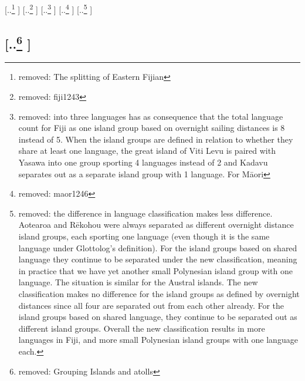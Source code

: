 \documentclass[unnumsec,webpdf,modern,medium]{oup-authoring-template}
\providecommand{\DIFdeltex}[1]{{\protect\color{red} [..\footnote{removed: #1} ]}} %
\providecommand{\DIFdelbegin}{} %
\providecommand{\DIFdelend}{} %
\providecommand{\DIFdel}[1]{\texorpdfstring{\DIFdeltex{#1}}{}} %
\newcommand{\DIFscaledelfig}{0.5}
\newlength{\DIFdelgraphicswidth} %
\newlength{\DIFdelgraphicsheight} %
\newcommand{\DIFdelincludegraphics}[2][]{%
\sbox{\DIFdelgraphicsbox}{\DIFOincludegraphics[#1]{#2}}%
\settoboxwidth{\DIFdelgraphicswidth}{\DIFdelgraphicsbox} %
\settoboxtotalheight{\DIFdelgraphicsheight}{\DIFdelgraphicsbox} %
\scalebox{\DIFscaledelfig}{%
\parbox[b]{\DIFdelgraphicswidth}{\usebox{\DIFdelgraphicsbox}\\[-\baselineskip] \rule{\DIFdelgraphicswidth}{0em}}\llap{\resizebox{\DIFdelgraphicswidth}{\DIFdelgraphicsheight}{%
\setlength{\unitlength}{\DIFdelgraphicswidth}%
\begin{picture}(1,1)%
\thicklines\linethickness{2pt} %
{\color[rgb]{1,0,0}\put(0,0){\framebox(1,1){}}}%
{\color[rgb]{1,0,0}\put(0,0){\line( 1,1){1}}}%
{\color[rgb]{1,0,0}\put(0,1){\line(1,-1){1}}}%
\end{picture}%
}\hspace*{3pt}}} %
} %
\DeclareRobustCommand{\DIFdelbegin}{\DIFOdelbegin \let\includegraphics\DIFdelincludegraphics} %
\DeclareRobustCommand{\DIFdelend}{\DIFOaddend \let\includegraphics\DIFOincludegraphics} %
\begin{document}
\DIFdelbegin \DIFdel{The splitting of Eastern Fijian }%
\DIFdel{fiji1243}%
\DIFdel{into three languages has as consequence that the total language count for Fiji as one island group based on overnight sailing distances is 8 instead of 5. When the island groups are defined in relation to whether they share at least one language, the great island of Viti Levu is paired with Yasawa into one group sporting 4 languages instead of 2 and Kadavu separates out as a separate island group with 1 language. For M\={a}ori }%
\DIFdel{maor1246}%
\DIFdel{the difference in language classification makes less difference. Aotearoa and  R\={e}kohou were always separated as different overnight distance island groups, each sporting one language (even though it is the same language under Glottolog's definition). For the island groups based on shared language they continue to be separated under the new classification, meaning in practice that we have yet another small Polynesian island group with one language. The situation is similar for the Austral islands. The new classification makes no difference for the island groups as defined by overnight distances since all four are separated out from each other already. For the island groups based on shared language, they continue to be separated out as different island groups. Overall the new classification results in more languages in Fiji, and more small Polynesian island groups with one language each.
}\DIFdelend %

\DIFdelbegin %
\subsection{\DIFdel{Grouping Islands and atolls}}
\addtocounter{subsection}{-1}%
\DIFdelend %
\end{document}
